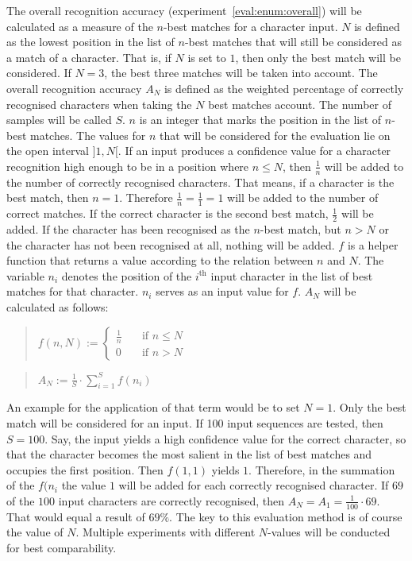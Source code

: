 The overall recognition accuracy (experiment~\ref{eval:enum:overall}) will 
be calculated as a measure of the \(n\)-best matches for a character input. 
\(N\) is defined as the lowest position in the list of \(n\)-best matches 
that will still be considered as a match of a character. 
That is, if \(N\) is set to \(1\), then only the best match will be considered.
If \(N = 3\), the best three matches will be taken into account.
The overall recognition accuracy \(A_{N}\) is defined as the weighted 
percentage of correctly recognised characters when taking the \(N\) best 
matches account. The number of samples will be called \(S\).
\(n\) is an integer that marks the position in the list of \(n\)-best matches.
The values for \(n\) that will be considered for the evaluation lie 
on the open interval \(]1,N[\). If an input produces a confidence value 
for a character recognition high enough to be in a position where \(n \leq N\), 
then \(\frac{1}{n}\) will be added to the number of correctly 
recognised characters.
That means, if a character is the best match, then \(n = 1\). 
Therefore \(\frac{1}{n} = \frac{1}{1} = 1\) will be added to the number of 
correct matches. If the correct character is the second best match, 
\(\frac{1}{2}\) will be added. If the character has been recognised as the 
\(n\)-best match, but \(n > N\) or the character has not been recognised at all,
nothing will be added. \(f\) is a helper function that returns a value
according to the relation between \(n\) and \(N\). The variable
\(n_{i}\) denotes the position of the \(i^{\text{th}}\) input character in
the list of best matches for that character. \(n_{i}\) serves as an input
value for \(f\). \(A_N\) will be calculated as follows:
\begin{quote}
  \(
    f(n, N):=
    \begin{cases}
      \frac{1}{n} & \quad \text{if $n \leq N$} \\
      0 & \quad \text{if $n > N$}
    \end{cases}
  \)
\end{quote}
\begin{quote}
  \(
    A_N := \frac{1}{S} \cdot \sum\limits_{i=1}^{S}{f(n_{i})}
  \)
\end{quote}
An example for the application of that term would be to set \(N = 1\).
Only the best match will be considered for an input.
If 100 input sequences are tested, then \(S=100\). 
Say, the input yields a high confidence value for the correct character,
so that the character becomes the most salient in the list of best matches
and occupies the first position. Then \(f(1,1)\) yields \(1\).
Therefore, in the summation of the \(f(n_{i}\) the value \(1\) will be added
for each correctly recognised character.
If \(69\) of the \(100\) input characters are correctly recognised,
then \(A_{N} = A_{1} = \frac{1}{100} \cdot 69\). That would equal a 
result of \(69\%\). The key to this evaluation method is of course the 
value of \(N\). Multiple experiments with different \(N\)-values will be 
conducted for best comparability.

